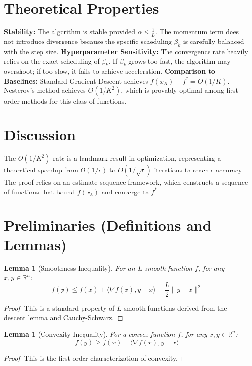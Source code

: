 \documentclass{article}
\newtheorem{lemma}[theorem]{Lemma}
\begin{document}
\section*{Theoretical Properties}
\textbf{Stability:} The algorithm is stable provided $\alpha \leq \frac{1}{L}$. The momentum term does not introduce divergence because the specific scheduling $\beta_k$ is carefully balanced with the step size.
\textbf{Hyperparameter Sensitivity:} The convergence rate heavily relies on the exact scheduling of $\beta_k$. If $\beta_k$ grows too fast, the algorithm may overshoot; if too slow, it fails to achieve acceleration.
\textbf{Comparison to Baselines:} Standard Gradient Descent achieves $f(x_K) - f^* = O(1/K)$. Nesterov's method achieves $O(1/K^2)$, which is provably optimal among first-order methods for this class of functions.

\section*{Discussion}
The $O(1/K^2)$ rate is a landmark result in optimization, representing a theoretical speedup from $O(1/\epsilon)$ to $O(1/\sqrt{\epsilon})$ iterations to reach $\epsilon$-accuracy. The proof relies on an estimate sequence framework, which constructs a sequence of functions that bound $f(x_k)$ and converge to $f^*$.

\section*{Preliminaries (Definitions and Lemmas)}
\begin{lemma}[Smoothness Inequality]
For an $L$-smooth function $f$, for any $x, y \in \mathbb{R}^n$:
$$f(y) \leq f(x) + \langle \nabla f(x), y - x \rangle + \frac{L}{2} \|y - x\|^2$$
\end{lemma}
\begin{proof}
This is a standard property of $L$-smooth functions derived from the descent lemma and Cauchy-Schwarz. 
\end{proof}

\begin{lemma}[Convexity Inequality]
For a convex function $f$, for any $x, y \in \mathbb{R}^n$:
$$f(y) \geq f(x) + \langle \nabla f(x), y - x \rangle$$
\end{lemma}
\begin{proof}
This is the first-order characterization of convexity.
\end{proof}
\end{document}
